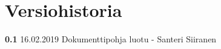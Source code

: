 \chapter*{Versiohistoria}

\newcommand{\currentversion}{0.1} %

\textbf{0.1} 16.02.2019 Dokumenttipohja luotu - Santeri Siiranen